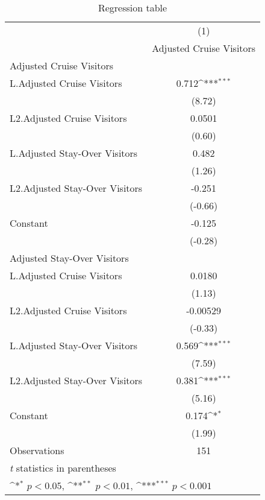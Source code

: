 \begin{table}[htbp]\centering
\def\sym#1{\ifmmode^{#1}\else\(^{#1}\)\fi}
\caption{Regression table\label{var\_cam}}
\begin{tabular}{l*{1}{c}}
\hline\hline
                    &\multicolumn{1}{c}{(1)}\\
                    &\multicolumn{1}{c}{Adjusted Cruise Visitors}\\
\hline
Adjusted Cruise Visitors&                     \\
L.Adjusted Cruise Visitors&       0.712\sym{***}\\
                    &      (8.72)         \\
[1em]
L2.Adjusted Cruise Visitors&      0.0501         \\
                    &      (0.60)         \\
[1em]
L.Adjusted Stay-Over Visitors&       0.482         \\
                    &      (1.26)         \\
[1em]
L2.Adjusted Stay-Over Visitors&      -0.251         \\
                    &     (-0.66)         \\
[1em]
Constant            &      -0.125         \\
                    &     (-0.28)         \\
\hline
Adjusted Stay-Over Visitors&                     \\
L.Adjusted Cruise Visitors&      0.0180         \\
                    &      (1.13)         \\
[1em]
L2.Adjusted Cruise Visitors&    -0.00529         \\
                    &     (-0.33)         \\
[1em]
L.Adjusted Stay-Over Visitors&       0.569\sym{***}\\
                    &      (7.59)         \\
[1em]
L2.Adjusted Stay-Over Visitors&       0.381\sym{***}\\
                    &      (5.16)         \\
[1em]
Constant            &       0.174\sym{*}  \\
                    &      (1.99)         \\
\hline
Observations        &         151         \\
\hline\hline
\multicolumn{2}{l}{\footnotesize \textit{t} statistics in parentheses}\\
\multicolumn{2}{l}{\footnotesize \sym{*} \(p<0.05\), \sym{**} \(p<0.01\), \sym{***} \(p<0.001\)}\\
\end{tabular}
\end{table}
